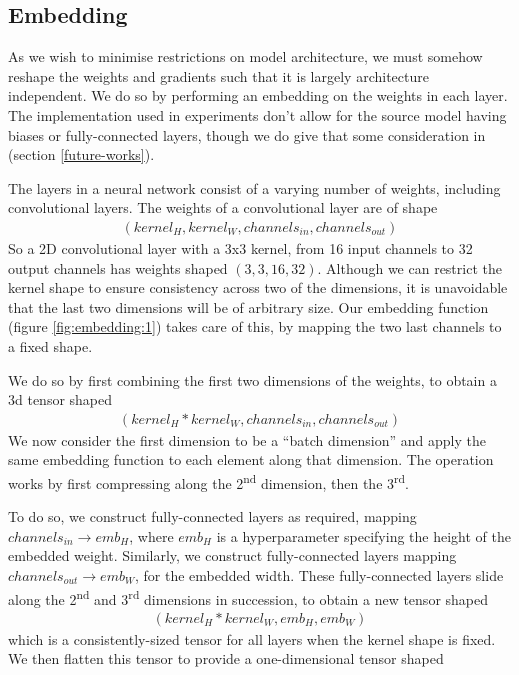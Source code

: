 \documentclass{report}
\begin{document}
\subsection{Embedding}
As we wish to minimise restrictions on model architecture, we must somehow reshape the weights and gradients such that it is largely architecture independent. We do so by performing an embedding on the weights in each layer. The implementation used in experiments don't allow for the source model having biases or fully-connected layers, though we do give that some consideration in (section \ref{future-works}). \par
The layers in a neural network consist of a varying number of weights, including convolutional layers. The weights of a convolutional layer are of shape
\begin{align}
	(kernel_{H}, kernel_{W}, channels_{in}, channels_{out})
\end{align}
So a 2D convolutional layer with a 3x3 kernel, from 16 input channels to 32 output channels has weights shaped $(3, 3, 16, 32)$. Although we can restrict the kernel shape to ensure consistency across two of the dimensions, it is unavoidable that the last two dimensions will be of arbitrary size. Our embedding function (figure \ref{fig:embedding:1}) takes care of this, by mapping the two last channels to a fixed shape. \par
We do so by first combining the first two dimensions of the weights, to obtain a 3d tensor shaped
\begin{align}
	(kernel_{H}*kernel_{W}, channels_{in}, channels_{out})
\end{align}
We now consider the first dimension to be a ``batch dimension'' and apply the same embedding function to each element along that dimension. The operation works by first compressing along the 2\textsuperscript{nd} dimension, then the 3\textsuperscript{rd}. \par
To do so, we construct fully-connected layers as required, mapping $channels_{in} \rightarrow emb_H$, where $emb_H$ is a hyperparameter specifying the height of the embedded weight. Similarly, we construct fully-connected layers mapping $channels_{out} \rightarrow emb_W$, for the embedded width. These fully-connected layers slide along the 2\textsuperscript{nd} and 3\textsuperscript{rd} dimensions in succession, to obtain a new tensor shaped
\begin{align}
(kernel_{H}*kernel_{W}, emb_H, emb_W)
\end{align}
which is a consistently-sized tensor for all layers when the kernel shape is fixed. We then flatten this tensor to provide a one-dimensional tensor shaped 
\end{document}
